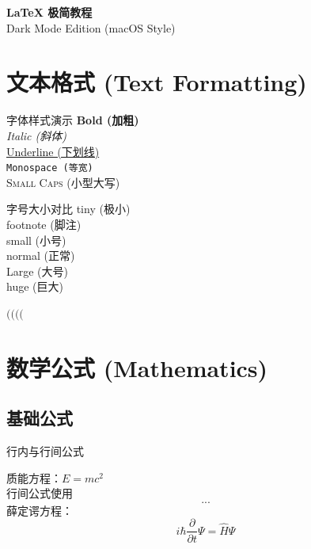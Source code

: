\documentclass[UTF8]{ctexart}
\begin{document}
	
	\begin{center}
		{\Huge \bfseries LaTeX 极简教程} \\
		\vspace{0.3cm}
		{\large Dark Mode Edition (macOS Style)}
	\end{center}
	
	\tableofcontents
	\newpage
	
	\section{文本格式 (Text Formatting)}
	
	\begin{code-left}{字体样式演示}
\textbf{Bold (加粗)} \\
\textit{Italic (斜体)} \\
\underline{Underline (下划线)} \\
\texttt{Monospace (等宽)} \\
\textsc{Small Caps (小型大写)}
	\end{code-left}
	
	\begin{code-left}{字号大小对比}
{\tiny tiny (极小)} \\
{\footnotesize footnote (脚注)} \\
{\small small (小号)} \\
{\normalsize normal (正常)} \\
{\Large Large (大号)} \\
{\huge huge (巨大)}

 $ \big( \Big( \bigg( \Bigg($
	\end{code-left}
	
	\section{数学公式 (Mathematics)}
	
	\subsection{基础公式}
	
	\begin{code-left}{行内与行间公式}

质能方程：$E = mc^2$\\
行间公式使用 \[...\]
薛定谔方程：
\[
i\hbar\frac{\partial}{\partial t}\Psi = \hat{H}\Psi
\]
	\end{code-left}
	
\end{document}
